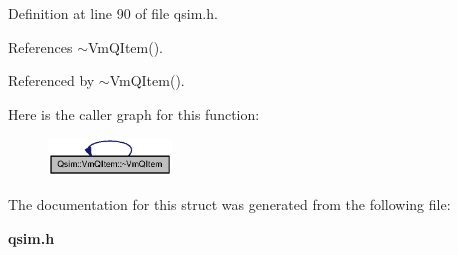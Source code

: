 Definition at line 90 of file qsim.h.

References $\sim$VmQItem().

Referenced by $\sim$VmQItem().

Here is the caller graph for this function:\nopagebreak
\begin{figure}[H]
\begin{center}
\leavevmode
\includegraphics[width=93pt]{structQsim_1_1VmQItem_8a88fbb4e7fdff1866eb67a373d0d43e_icgraph}
\end{center}
\end{figure}


The documentation for this struct was generated from the following file:\begin{CompactItemize}
\item 
{\bf qsim.h}\end{CompactItemize}

